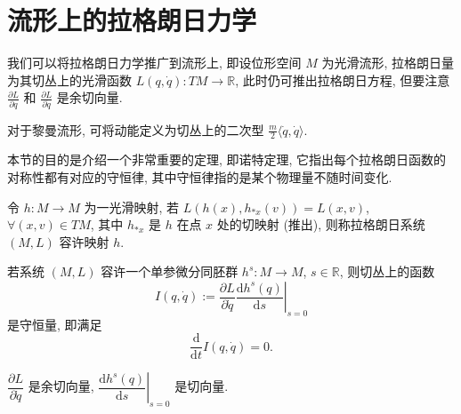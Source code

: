 \section{流形上的拉格朗日力学}
我们可以将拉格朗日力学推广到流形上, 即设位形空间 $ M $ 为光滑流形, 拉格朗日量为其切丛上的光滑函数 $ L(q,\dot{q}):TM\to\mathbb{R} $, 此时仍可推出拉格朗日方程, 但要注意 $ \frac{\partial L}{\partial q} $ 和 $ \frac{\partial L}{\partial\dot{q}} $ 是余切向量.

\begin{remark}
    对于黎曼流形, 可将动能定义为切丛上的二次型 $ \frac{m}{2}\langle \dot{q},\dot{q} \rangle $.
\end{remark}

本节的目的是介绍一个非常重要的定理, 即诺特定理, 它指出每个拉格朗日函数的对称性都有对应的守恒律, 其中守恒律指的是某个物理量不随时间变化.

令 $ h:M\to M $ 为一光滑映射, 若 $ L(h(x),h_{*x}(v))=L(x,v) $, $ \forall(x,v)\in TM$, 其中 $ h_{*x} $ 是 $ h $ 在点 $ x $ 处的切映射 (推出), 则称拉格朗日系统 $ (M,L) $ 容许映射 $ h $.

\begin{theorem}[诺特定理]
    若系统 $ (M,L) $ 容许一个单参微分同胚群 $ h^s:M\to M $, $ s\in\mathbb{R} $, 则切丛上的函数
    \[ I(q,\dot{q}):=\left.\frac{\partial L}{\partial\dot{q}}\frac{\mathrm{d}h^s(q)}{\mathrm{d}s}\right|_{s=0} \]
    是守恒量, 即满足
    \[ \frac{\mathrm{d}}{\mathrm{d}t}I(q,\dot{q})=0. \]
\end{theorem}

\begin{remark}
    $ \dfrac{\partial L}{\partial\dot{q}} $ 是余切向量, $ \left.\dfrac{\mathrm{d}h^s(q)}{\mathrm{d}s}\right|_{s=0} $ 是切向量.
\end{remark}

